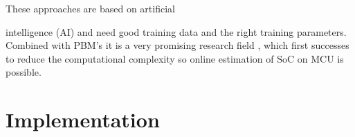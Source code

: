 These approaches are based on artificial

intelligence (AI) and need good training data and the right training parameters. Combined with PBM's it is a very promising research field \cite{9477587}, which first successes to reduce the computational complexity so online estimation of SoC on MCU is	 possible.





\chapter{Implementation}
\label{chap:Implementation}


